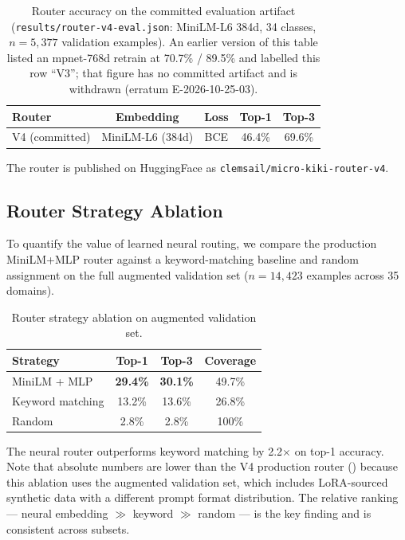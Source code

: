 \documentclass[11pt,a4paper]{article}
\begin{document}
\begin{table}[h]
\centering
\caption{Router accuracy on the committed evaluation artifact (\texttt{results/router-v4-eval.json}: MiniLM-L6 384d, 34 classes, $n = 5{,}377$ validation examples). An earlier version of this table listed an mpnet-768d retrain at 70.7\% / 89.5\% and labelled this row ``V3''; that figure has no committed artifact and is withdrawn (erratum E-2026-10-25-03).}
\label{tab:router}
\begin{tabular}{lcccc}
\toprule
\textbf{Router} & \textbf{Embedding} & \textbf{Loss} & \textbf{Top-1} & \textbf{Top-3} \\
\midrule
V4 (committed) & MiniLM-L6 (384d) & BCE & 46.4\% & 69.6\% \\
\bottomrule
\end{tabular}
\end{table}

The router is published on HuggingFace as \texttt{clemsail/micro-kiki-router-v4}.

\subsection{Router Strategy Ablation}

To quantify the value of learned neural routing, we compare the production MiniLM+MLP router against a keyword-matching baseline and random assignment on the full augmented validation set ($n=14{,}423$ examples across 35 domains).

\begin{table}[h]
\centering
\caption{Router strategy ablation on augmented validation set.}
\label{tab:router-ablation}
\begin{tabular}{lccc}
\toprule
\textbf{Strategy} & \textbf{Top-1} & \textbf{Top-3} & \textbf{Coverage} \\
\midrule
MiniLM + MLP & \textbf{29.4\%} & \textbf{30.1\%} & 49.7\% \\
Keyword matching & 13.2\% & 13.6\% & 26.8\% \\
Random & 2.8\% & 2.8\% & 100\% \\
\bottomrule
\end{tabular}
\end{table}

The neural router outperforms keyword matching by 2.2$\times$ on top-1 accuracy. Note that absolute numbers are lower than the V4 production router () because this ablation uses the augmented validation set, which includes LoRA-sourced synthetic data with a different prompt format distribution. The relative ranking --- neural embedding $\gg$ keyword $\gg$ random --- is the key finding and is consistent across subsets.
\end{document}
